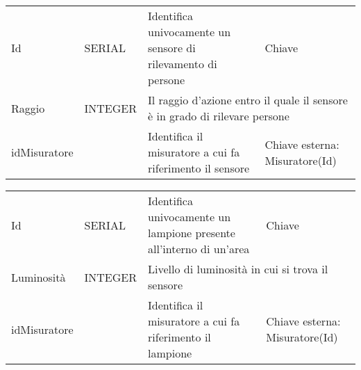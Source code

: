 \begin{center}
    \begin{tabularx}{\textwidth}{|l|l|l|X|}
        \hline
        \rowcolor{gray!30}
        \multicolumn{4}{|c|}{\textbf{SENSORE}}\\
        \hline
        Id & SERIAL & Identifica univocamente un sensore di rilevamento di persone & Chiave\\
        \hline
        Raggio & INTEGER & \multicolumn{2}{l|}{Il raggio d'azione entro il quale il sensore è in grado di rilevare persone} \\
        idMisuratore & & Identifica il misuratore a cui fa riferimento il sensore & Chiave esterna: Misuratore(Id)\\
        \hline
    \end{tabularx}
\end{center}

\begin{center}
    \begin{tabularx}{\textwidth}{|l|l|l|X|}
        \hline
        \rowcolor{gray!30}
        \multicolumn{4}{|c|}{\textbf{LAMPIONE}}\\
        \hline
        Id & SERIAL & Identifica univocamente un lampione presente all'interno di un'area & Chiave\\
        \hline
        Luminosità & INTEGER & \multicolumn{2}{l|}{Livello di luminosità in cui si trova il sensore} \\
        idMisuratore & & Identifica il misuratore a cui fa riferimento il lampione & Chiave esterna: Misuratore(Id)\\
        \hline
    \end{tabularx}
\end{center}